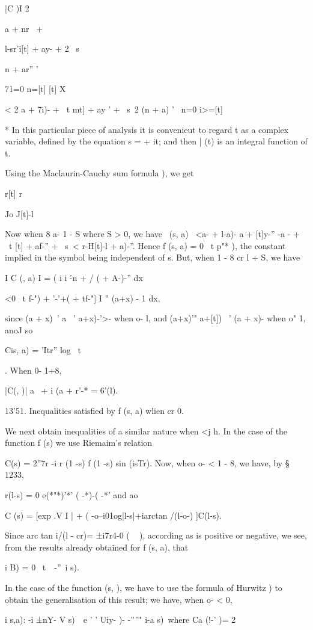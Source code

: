 |C )I 2 \ \ {a + nr \ + \ \ { l-sr'i[t] + ay- + 2 \ s\ \ {n + ar'' '

71=0 n=[t] [t] X

< 2 a + 7i)- + \ t mt] + ay ' + \ s\ 2 (n + a) ' \ n=0 i>=[t]

* In this particular piece of analysis it is convenieut to regard t as
a complex variable, defined by the equation s = + it; and then | (t)
is an integral function of t.

%
%

Using the Maclaurin-Cauchy sum formula ), we get

r[t] r

Jo J[t]-l

Now when 8 a- 1 - S where S > 0, we have \ (s, a) \ <a- + l-a)- a +
[t]y-'' -a - + \ t [t] + af-'' + \ s\ < r-H[t]-l + a)-''. Hence f (s,
a) = 0 \ t p"* ), the constant implied in the symbol being independent
of s. But, when 1 - 8 cr l + S, we have

I C (, a) I = ( i i \'-n + / ( + A-)-'' dx

<0 \ t f-") + '-'+( + tf-"] I '' (a+x) - 1 dx,

since (a + x)~' a ~' a+x)-'>- when o- l, and (a+x)'" a+[t]) ~' (a +
x)- when o" 1, anoJ so

Cis, a) = 'Itr'' log \ t\ \ }. When 0- 1+8,

|C(, )| a~ + i (a + r'-* = 6'(l).

13'51. Inequalities satisfied by f (s, a) wlien cr 0.

We next obtain inequalities of a similar nature when <j h. In the case
of the function f (s) we use Riemaim's relation

C(s) = 2''7r -i r (1 -s) f (1 -s) sin (isTr). Now, when o- < 1 - 8, we
have, by § 1233,

r(l-s) = 0 e(*"*)'*' ( -*)-( -*' and ao

C (s) = [exp .V I | + ( -o--i01og|l-s|+iarctan /(l-o-) ]C(l-s).

Since arc tan i/(l - cr)= ±i7r4-0 ( ~ ), according as is positive or
negative, we see, from the results already obtained for f (s, a), that

i B) = 0 \ t\ \ -''\ i s).

In the case of the function (s, ), we have to use the formula of
Hurwitz ) to obtain the generalisation of this result; we
have, when o- < 0,

i s,a): -i ±nY- V s)\ \ e ' ' Uiy- )- -''''" i-a s)\ where Ca (!-' )=
2

}}
